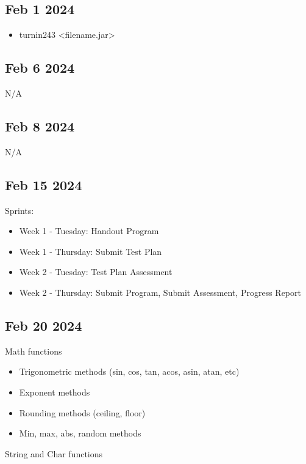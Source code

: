 \documentclass[12pt]{article}
\begin{document}
\subsection*{Feb 1 2024}

\begin{itemize}
		  \item turnin243 <filename.jar>
\end{itemize}

\subsection*{Feb 6 2024}

N/A

\subsection*{Feb 8 2024}
   	
N/A

\subsection*{Feb 15 2024}

Sprints:

\begin{itemize}
		  \item Week 1 - Tuesday: Handout Program
		  \item Week 1 - Thursday: Submit Test Plan
		  \item Week 2 - Tuesday: Test Plan Assessment
		  \item Week 2 - Thursday: Submit Program, Submit Assessment, Progress Report 
\end{itemize}

\subsection*{Feb 20 2024}

Math functions

\begin{itemize}
		  \item Trigonometric methods (sin, cos, tan, acos, asin, atan, etc)
		  \item Exponent methods 
		  \item Rounding methods (ceiling, floor)
		  \item Min, max, abs, random methods
\end{itemize}

String and Char functions
\end{document}
